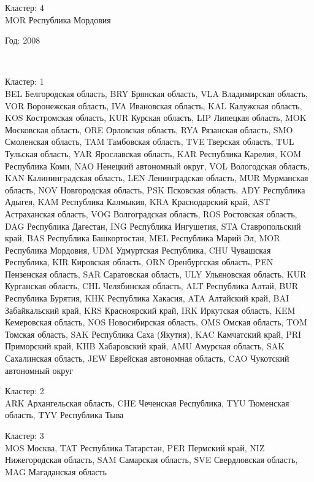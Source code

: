 \documentclass[11pt]{article}
\begin{document}
Кластер:  4 \\
MOR Республика Мордовия

\begin{center}
Год:  2008
\end{center}

    \begin{center}
    \end{center}
    { \hspace*{\fill} \\}
    
Кластер:  1 \\
BEL Белгородская область, BRY Брянская область, VLA Владимирская область, VOR Воронежская область, IVA Ивановская область, KAL Калужская область, KOS Костромская область, KUR Курская область, LIP Липецкая область, MOK Московская область, ORE Орловская область, RYA Рязанская область, SMO Смоленская область, TAM Тамбовская область, TVE Тверская область, TUL Тульская область, YAR Ярославская область, KAR Республика Карелия, KOM Республика Коми, NAO Ненецкий автономный округ, VOL Вологодская область, KAN Калинингpадская область, LEN Ленинградская область, MUR Мурманская область, NOV Новгородская область, PSK Псковская область, ADY Республика Адыгея, KAM Республика Калмыкия, KRA Краснодарский край, AST Астраханская область, VOG Волгоградская область, ROS Ростовская область, DAG Республика Дагестан, ING Республика Ингушетия, STA Ставропольский край, BAS Республика Башкортостан, MEL Республика Марий Эл, MOR Республика Мордовия, UDM Удмуртская Республика, CHU Чувашская Республика, KIR Кировская область, ORN Оренбургская область, PEN Пензенская область, SAR Саратовская область, ULY Ульяновская область, KUR Курганская область, CHL Челябинская область, ALT Республика Алтай, BUR Республика Бурятия, KHK Республика Хакасия, ATA Алтайский край, BAI Забайкальский край, KRS Красноярский край, IRK Иркутская область, KEM Кемеровская область, NOS Новосибирская область, OMS Омская область, TOM Томская область, SAK Республика Саха (Якутия), KAC Камчатский край, PRI Приморский край, KHB Хабаровский край, AMU Амурская область, SAK Сахалинская область, JEW Еврейская автономная область, CAO Чукотский автономный округ

Кластер:  2 \\
ARK Архангельская область, CHE Чеченская Республика, TYU Тюменская область, TYV Республика Тыва

Кластер:  3 \\
MOS Москва, TAT Республика Татарстан, PER Пермский край, NIZ Нижегородская область, SAM Самарская область, SVE Свердловская область, MAG Магаданская область
\end{document}
